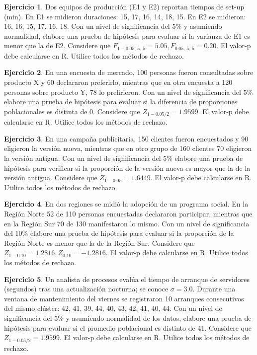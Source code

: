\documentclass[
  11pt,
]{book}
\theoremstyle{definition}
\theoremstyle{definition}
\theoremstyle{definition}
\newtheorem{exercise}{Ejercicio}[chapter]
\theoremstyle{definition}
\theoremstyle{remark}
\begin{document}
\begin{exercise}
Dos equipos de producción (E1 y E2) reportan tiempos de set-up (min). En E1 se midieron duraciones: 15, 17, 16, 14, 18, 15. En E2 se midieron: 16, 16, 15, 17, 16, 18. Con un nivel de significancia del 5\% y asumiendo normalidad, elabore una prueba de hipótesis para evaluar si la varianza de E1 es menor que la de E2. Considere que \(F_{1-0.05,\,5,\,5}=5.05, F_{0.05,\,5,\,5}=0.20\). El valor-p debe calcularse en R. Utilice todos los métodos de rechazo.
\end{exercise}

\begin{exercise}
En una encuesta de mercado, 100 personas fueron consultadas sobre producto X y 60 declararon preferirlo, mientras que en otra encuesta a 120 personas sobre producto Y, 78 lo prefirieron. Con un nivel de significancia del 5\% elabore una prueba de hipótesis para evaluar si la diferencia de proporciones poblacionales es distinta de 0. Considere que \(Z_{1-0.05/2}=1.9599\). El valor-p debe calcularse en R. Utilice todos los métodos de rechazo.
\end{exercise}

\begin{exercise}
En una campaña publicitaria, 150 clientes fueron encuestados y 90 eligieron la versión nueva, mientras que en otro grupo de 160 clientes 70 eligieron la versión antigua. Con un nivel de significancia del 5\% elabore una prueba de hipótesis para verificar si la proporción de la versión nueva es mayor que la de la versión antigua. Considere que \(Z_{1-0.05}=1.6449\). El valor-p debe calcularse en R. Utilice todos los métodos de rechazo.
\end{exercise}

\begin{exercise}
En dos regiones se midió la adopción de un programa social. En la Región Norte 52 de 110 personas encuestadas declararon participar, mientras que en la Región Sur 70 de 130 manifestaron lo mismo. Con un nivel de significancia del 10\% elabore una prueba de hipótesis para evaluar si la proporción de la Región Norte es menor que la de la Región Sur. Considere que \(Z_{1-0.10}=1.2816, Z_{0.10}=-1.2816\). El valor-p debe calcularse en R. Utilice todos los métodos de rechazo.
\end{exercise}

\begin{exercise}
Un analista de procesos evalúa el tiempo de arranque de servidores (segundos) tras una actualización nocturna; se conoce \(\sigma=3.0\). Durante una ventana de mantenimiento del viernes se registraron 10 arranques consecutivos del mismo clúster: 42, 41, 39, 44, 40, 43, 42, 41, 40, 44. Con un nivel de significancia del 5\% y asumiendo normalidad de los datos, elabore una prueba de hipótesis para evaluar si el promedio poblacional es distinto de 41. Considere que \(Z_{1-0.05/2}=1.9599\). El valor-p debe calcularse en R. Utilice todos los métodos de rechazo.
\end{exercise}
\end{document}
